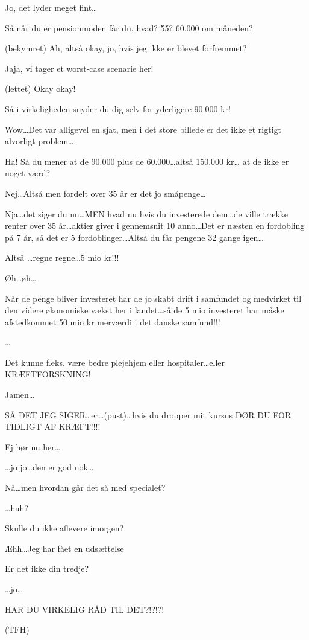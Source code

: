 \documentclass[a4paper,11pt]{article}
\begin{document}
\begin{sketch}
 Jo, det lyder meget fint\dots

 Så når du er pensionmoden får du, hvad? 55? 60.000 om måneden?

 (bekymret) Ah, altså okay, jo, hvis jeg ikke er blevet forfremmet?

 Jaja, vi tager et worst-case scenarie her!

 (lettet) Okay okay!

 Så i virkeligheden snyder du dig selv for yderligere 90.000 kr!

 Wow\dots Det var alligevel en sjat, men i det store billede er det
ikke et rigtigt alvorligt problem\dots

 Ha! Så du mener at de 90.000 plus de 60.000\dots altså 150.000 kr\dots
at de ikke er noget værd?

 Nej\dots Altså men fordelt over 35 år er det jo småpenge\dots

 Nja\dots det siger du nu\dots MEN hvad nu hvis du investerede dem\dots de
ville trække renter over 35 år\dots aktier giver i gennemsnit 10%
anno\dots Det er næsten en fordobling på 7 år, så det er 5
fordoblinger\dots Altså du får pengene 32 gange igen\dots

 

 Altså \dots regne regne\dots 5 mio kr!!!

 Øh\dots øh\dots

 Når de penge bliver investeret har de jo skabt drift i samfundet og
medvirket til den videre økonomiske vækst her i landet\dots så de 5 mio
investeret har måske afstedkommet 50 mio kr merværdi i det danske
samfund!!!

 \dots

 Det kunne f.eks. være bedre plejehjem eller hospitaler\dots eller
KRÆFTFORSKNING!

 Jamen\dots

 SÅ DET JEG SIGER\dots er\dots (pust)\dots hvis du dropper mit
kursus DØR DU FOR TIDLIGT AF KRÆFT!!!!

 Ej hør nu her\dots

 \dots jo jo\dots den er god nok\dots


 Nå\dots men hvordan går det så med specialet?

 \dots huh?

 Skulle du ikke aflevere imorgen?

 Æhh\dots Jeg har fået en udsættelse

 Er det ikke din tredje?

 \dots jo\dots



 HAR DU VIRKELIG RÅD TIL DET?!?!?!

(TFH)



\end{sketch}
\end{document}
